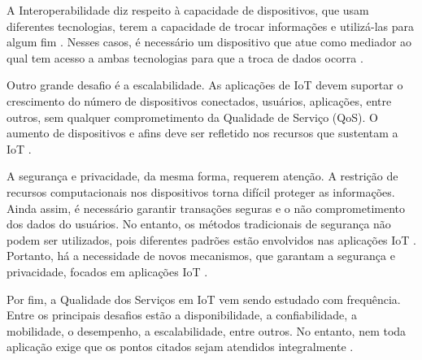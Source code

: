 A Interoperabilidade diz respeito à capacidade de dispositivos, que usam diferentes tecnologias, terem a capacidade de trocar informações e utilizá-las para algum fim \cite{Elkhodr2016}. Nesses casos, é necessário um dispositivo que atue como mediador ao qual tem acesso a ambas tecnologias para que a troca de dados ocorra \cite{Hussain2016}.

Outro grande desafio é a escalabilidade. As aplicações de IoT devem suportar o crescimento do número de dispositivos conectados, usuários, aplicações, entre outros, sem qualquer comprometimento da Qualidade de Serviço (QoS). O aumento de dispositivos e afins deve ser refletido nos recursos que sustentam a IoT \cite{Hussain2016}. 

A segurança e privacidade, da mesma forma, requerem atenção. A restrição de recursos computacionais nos dispositivos torna difícil proteger as informações. Ainda assim, é necessário garantir transações seguras e o não comprometimento dos dados do usuários. No entanto, os métodos tradicionais de segurança não podem ser utilizados, pois diferentes padrões estão envolvidos nas aplicações IoT \cite{Hussain2016}.
Portanto, há a necessidade de novos mecanismos, que garantam a segurança e privacidade, focados em aplicações IoT \cite{Elkhodr2016}.


Por fim, a Qualidade dos Serviços em IoT vem sendo estudado com frequência. Entre os principais desafios estão a disponibilidade, a confiabilidade, a mobilidade, o desempenho, a escalabilidade, entre outros. No entanto, nem toda aplicação exige que os pontos citados sejam atendidos integralmente \cite{Hussain2016}. 